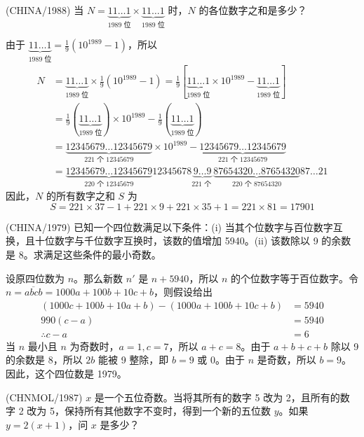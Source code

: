 \begin{questions}
\question (CHINA/1988) 当 $N = \underbrace{11 \dots 1}_{1989 \text{ 位}} \times \underbrace{11 \dots 1}_{1989 \text{ 位}}$ 时，$N$ 的各位数字之和是多少？

\begin{solution}
由于 $\underbrace{11 \dots 1}_{1989 \text{ 位}} = \frac{1}{9}(10^{1989} - 1)$，所以
\begin{align*}
N &= \underbrace{11 \dots 1}_{1989 \text{ 位}} \times \frac{1}{9}(10^{1989} - 1) = \frac{1}{9} [ \underbrace{11 \dots 1}_{1989 \text{ 位}} \times 10^{1989} - \underbrace{11 \dots 1}_{1989 \text{ 位}} ] \\
&= \frac{1}{9} (\underbrace{11 \dots 1}_{1989 \text{ 位}}) \times 10^{1989} - \frac{1}{9} (\underbrace{11 \dots 1}_{1989 \text{ 位}}) \\
&= \underbrace{12345679 \dots 12345679}_{221 \text{ 个 } 12345679} \times 10^{1989} - \underbrace{12345679 \dots 12345679}_{221 \text{ 个 } 12345679} \\
&= \underbrace{12345679 \dots 12345679}_{220 \text{ 个 } 12345679} 12345678 \underbrace{9 \dots 9}_{221 \text{ 个 }} \underbrace{87654320 \dots 87654320}_{220 \text{ 个 } 87654320} 87 \dots 21
\end{align*}
因此，$N$ 的所有数字之和 $S$ 为
\[
S = 221 \times 37 - 1 + 221 \times 9 + 221 \times 35 + 1 = 221 \times 81 = 17901
\]
\end{solution}

\question (CHINA/1979) 已知一个四位数满足以下条件：(i) 当其个位数字与百位数字互换，且十位数字与千位数字互换时，该数的值增加 5940。(ii) 该数除以 9 的余数是 8。求满足这些条件的最小奇数。

\begin{solution}
设原四位数为 $n$。那么新数 $n'$ 是 $n + 5940$，所以 $n$ 的个位数字等于百位数字。令 $n = \overline{abcb} = 1000a + 100b + 10c + b$，则假设给出
\begin{align*}
(1000c + 100b + 10a + b) - (1000a + 100b + 10c + b) &= 5940 \\
990(c - a) &= 5940 \\
\therefore c - a &= 6
\end{align*}
当 $n$ 最小且 $n$ 为奇数时，$a = 1, c = 7$，所以 $a + c = 8$。由于 $a + b + c + b$ 除以 9 的余数是 8，所以 $2b$ 能被 9 整除，即 $b = 9$ 或 0。由于 $n$ 是奇数，所以 $b = 9$。因此，这个四位数是 1979。
\end{solution}

\question (CHNMOL/1987) $x$ 是一个五位奇数。当将其所有的数字 5 改为 2，且所有的数字 2 改为 5，保持所有其他数字不变时，得到一个新的五位数 $y$。如果 $y = 2(x + 1)$，问 $x$ 是多少？


\end{questions}
